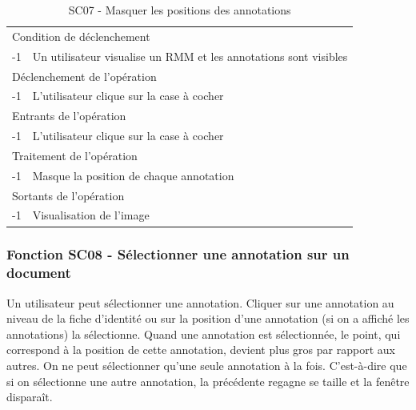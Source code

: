 \documentclass[a4paper]{article}
\begin{document}
\begin{table}[H]
  \centering
   \small
	\begin{tabular}{|c|p{12cm}|}
   		\hline
   			\rowcolor{lightgray}\multicolumn{2}{|c|}{\textbf{SC07 - Masquer les positions des annotations}} \\
   		\hline
   			\multicolumn{2}{|l|}{Condition de d\'eclenchement} \\
   		\hline
   			-1 & Un utilisateur visualise un RMM et les annotations sont visibles\\
   		\hline
   			\multicolumn{2}{|l|}{D\'eclenchement de l'op\'eration} \\
   		\hline
   			-1 & L’utilisateur clique sur la case à cocher\\
   		\hline
   			\multicolumn{2}{|l|}{Entrants de l'op\'eration} \\
   		\hline
   			-1 & L’utilisateur clique sur la case à cocher\\
   		\hline
   			\multicolumn{2}{|l|}{Traitement de l'op\'eration} \\
  		\hline
   			-1 & Masque la position de chaque annotation\\
   		\hline
   			\multicolumn{2}{|l|}{Sortants de l'op\'eration} \\
   		\hline
   			-1 & Visualisation de l’image\\
   		\hline
	\end{tabular}
  \caption{SC07 - Masquer les positions des annotations}
  \normalsize
  \label{tab:masquer_position_annotation}
\end{table}

\subsubsection{Fonction SC08 - Sélectionner une annotation sur un document}
Un utilisateur peut sélectionner une annotation. Cliquer sur une annotation au niveau de la fiche d’identité ou sur la position d'une annotation (si on a affiché les annotations) la sélectionne. Quand une annotation est sélectionnée, le point, qui correspond à la position de cette annotation, devient plus gros par rapport aux autres. On ne peut sélectionner qu’une seule annotation à la fois. C’est-à-dire que si on sélectionne une autre annotation, la précédente regagne se taille et la fenêtre disparaît.\\
\end{document}

